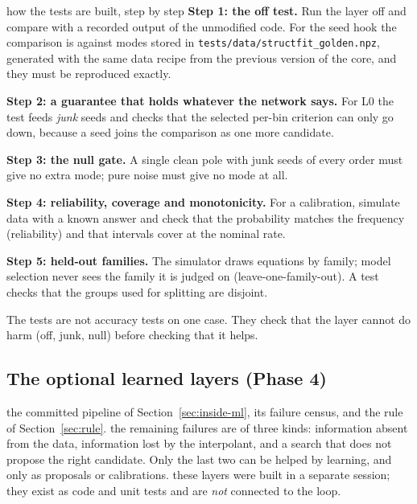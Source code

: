 \begin{explained}{how the tests are built, step by step}
\textbf{Step 1: the off test.} Run the layer off and compare with a recorded output of the unmodified code. For the seed hook the comparison is against modes stored in \texttt{tests/data/structfit\_golden.npz}, generated with the same data recipe from the previous version of the core, and they must be reproduced exactly.

\medskip\textbf{Step 2: a guarantee that holds whatever the network says.} For L0 the test feeds \emph{junk} seeds and checks that the selected per-bin criterion can only go down, because a seed joins the comparison as one more candidate.

\medskip\textbf{Step 3: the null gate.} A single clean pole with junk seeds of every order must give no extra mode; pure noise must give no mode at all.

\medskip\textbf{Step 4: reliability, coverage and monotonicity.} For a calibration, simulate data with a known answer and check that the probability matches the frequency (reliability) and that intervals cover at the nominal rate.

\medskip\textbf{Step 5: held-out families.} The simulator draws equations by family; model selection never sees the family it is judged on (leave-one-family-out). A test checks that the groups used for splitting are disjoint.
\end{explained}

\begin{takeaway}
The tests are not accuracy tests on one case. They check that the layer cannot do harm (off, junk, null) before checking that it helps.
\end{takeaway}

\subsection{The optional learned layers (Phase 4)}\label{sec:learned}
\sectionbrief
{the committed pipeline of Section~\ref{sec:inside-ml}, its failure census, and the rule of Section~\ref{sec:rule}.}
{the remaining failures are of three kinds: information absent from the data, information lost by the interpolant, and a search that does not propose the right candidate. Only the last two can be helped by learning, and only as proposals or calibrations.}
{these layers were built in a separate session; they exist as code and unit tests and are \emph{not} connected to the loop.}

